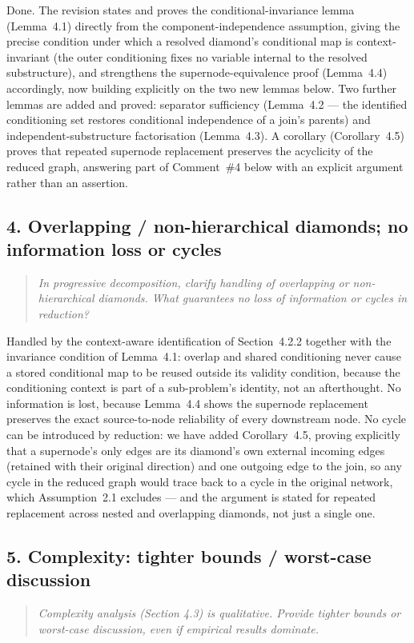 \documentclass[11pt]{article}
\newenvironment{revcomment}
  {\begin{quote}\itshape\color{gray!60!black}}
  {\end{quote}}
\begin{document}
Done. The revision states and proves the conditional-invariance lemma (Lemma~4.1) directly from the component-independence assumption, giving the precise condition under which a resolved diamond's conditional map is context-invariant (the outer conditioning fixes no variable internal to the resolved substructure), and strengthens the supernode-equivalence proof (Lemma~4.4) accordingly, now building explicitly on the two new lemmas below. Two further lemmas are added and proved: separator sufficiency (Lemma~4.2 --- the identified conditioning set restores conditional independence of a join's parents) and independent-substructure factorisation (Lemma~4.3). A corollary (Corollary~4.5) proves that repeated supernode replacement preserves the acyclicity of the reduced graph, answering part of Comment~\#4 below with an explicit argument rather than an assertion.

\subsection*{4. Overlapping / non-hierarchical diamonds; no information loss or cycles}
\begin{revcomment}
In progressive decomposition, clarify handling of overlapping or non-hierarchical diamonds. What guarantees no loss of information or cycles in reduction?
\end{revcomment}

Handled by the context-aware identification of Section~4.2.2 together with the invariance condition of Lemma~4.1: overlap and shared conditioning never cause a stored conditional map to be reused outside its validity condition, because the conditioning context is part of a sub-problem's identity, not an afterthought. No information is lost, because Lemma~4.4 shows the supernode replacement preserves the exact source-to-node reliability of every downstream node. No cycle can be introduced by reduction: we have added Corollary~4.5, proving explicitly that a supernode's only edges are its diamond's own external incoming edges (retained with their original direction) and one outgoing edge to the join, so any cycle in the reduced graph would trace back to a cycle in the original network, which Assumption~2.1 excludes --- and the argument is stated for repeated replacement across nested and overlapping diamonds, not just a single one.

\subsection*{5. Complexity: tighter bounds / worst-case discussion}
\begin{revcomment}
Complexity analysis (Section 4.3) is qualitative. Provide tighter bounds or worst-case discussion, even if empirical results dominate.
\end{revcomment}
\end{document}

